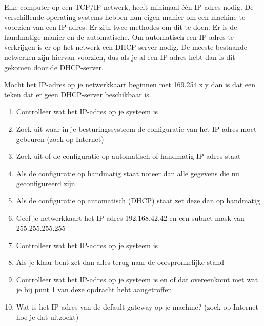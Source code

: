 Elke computer op een TCP/IP netwerk, heeft minimaal \'e\'en IP-adres nodig. De verschillende operating systems hebben hun eigen manier om een machine te voorzien van een IP-adres. Er zijn twee methodes om dit te doen. Er is de handmatige manier en de automatische. Om automatisch een IP-adres te verkrijgen is er op het netwerk een DHCP-server nodig. De meeste bestaande netwerken zijn hiervan voorzien, dus als je al een IP-adres hebt dan is dit gekomen door de DHCP-server.

Mocht het IP-adres op je netwerkkaart beginnen met 169.254.x.y dan is dat een teken dat er geen DHCP-server beschikbaar is.

\begin{enumerate}
\item Controlleer wat het IP-adres op je systeem is
\item Zoek uit waar in je besturingssysteem de configuratie van het IP-adres moet gebeuren (zoek op Internet)
\item Zoek uit of de configuratie op automatisch of handmatig IP-adres staat
\item Als de configuratie op handmatig staat noteer dan alle gegevens die nu geconfigureerd zijn
\item Als de configuratie op automatisch (DHCP) staat zet deze dan op handmatig
\item Geef je netwerkkaart het IP adres 192.168.42.42 en een subnet-mask van 255.255.255.255
\item Controlleer wat het IP-adres op je systeem is
\item Als je klaar bent zet dan alles terug naar de oorspronkelijke stand
\item Controlleer wat het IP-adres op je systeem is en of dat overeenkomt met wat je bij punt 1 van deze opdracht hebt aangetroffen
\item Wat is het IP adres van de default gateway op je machine? (zoek op Internet hoe je dat uitzoekt)
\end{enumerate}

